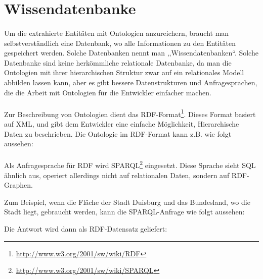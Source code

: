 \section{Wissendatenbanke}
\paragraph{}
Um die extrahierte Entitäten mit Ontologien anzureichern, braucht man selbstverständlich eine Datenbank, wo alle Informationen zu den Entitäten gespeichert werden. Solche Datenbanken nennt man ,,Wissendatenbanken``. Solche Datenbanke sind keine herkömmliche relationale Datenbanke, da man die Ontologien mit ihrer hierarchischen Struktur zwar auf ein relationales Modell abbilden lassen kann, aber es gibt bessere Datenstrukturen und Anfragesprachen, die die Arbeit mit Ontologien für die Entwickler einfacher machen.

\paragraph{}
Zur Beschreibung von Ontologien dient das RDF-Format\footnote{\url{http://www.w3.org/2001/sw/wiki/RDF}}. Dieses Format basiert auf XML, und gibt dem Entwickler eine einfache Möglichkeit, Hierarchische Daten zu beschrieben. Die Ontologie im RDF-Format kann z.B. wie folgt aussehen:
\lstset{language=XML}


\paragraph{}
Als Anfragesprache für RDF wird SPARQL\footnote{\url{http://www.w3.org/2001/sw/wiki/SPARQL}} eingesetzt. Diese Sprache sieht SQL ähnlich aus, operiert allerdings nicht auf relationalen Daten, sondern auf RDF-Graphen. 

Zum Beispiel, wenn die Fläche der Stadt Duisburg und das Bundesland, wo die Stadt liegt, gebraucht werden, kann die SPARQL-Anfrage wie folgt aussehen:
\lstset{language=SPARQL}


Die Antwort wird dann als RDF-Datensatz geliefert:
\lstset{language=XML}
